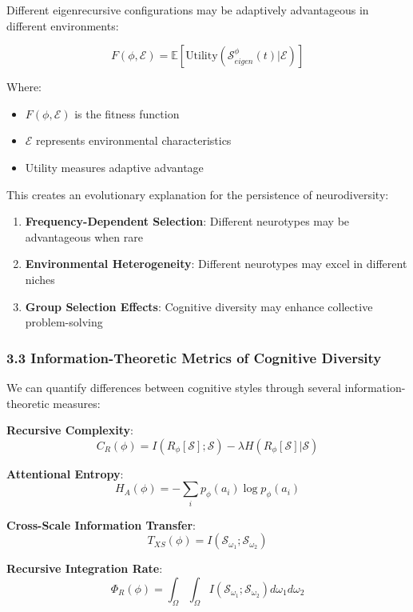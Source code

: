 \documentclass[
]{article}
\providecommand{\tightlist}{%
  \setlength{\itemsep}{0pt}\setlength{\parskip}{0pt}}
\begin{document}
Different eigenrecursive configurations may be adaptively advantageous
in different environments:

\[F(\phi, \mathcal{E}) = \mathbb{E}[\text{Utility}(\mathcal{S}_{eigen}^{\phi}(t) | \mathcal{E})]\]

Where:

\begin{itemize}
\tightlist
\item
  \(F(\phi, \mathcal{E})\) is the fitness function
\item
  \(\mathcal{E}\) represents environmental characteristics
\item
  Utility measures adaptive advantage
\end{itemize}

This creates an evolutionary explanation for the persistence of
neurodiversity:

\begin{enumerate}
\def\labelenumi{\arabic{enumi}.}
\tightlist
\item
  \textbf{Frequency-Dependent Selection}: Different neurotypes may be
  advantageous when rare
\item
  \textbf{Environmental Heterogeneity}: Different neurotypes may excel
  in different niches
\item
  \textbf{Group Selection Effects}: Cognitive diversity may enhance
  collective problem-solving
\end{enumerate}

\subsubsection{3.3 Information-Theoretic Metrics of Cognitive
Diversity}\label{information-theoretic-metrics-of-cognitive-diversity}

We can quantify differences between cognitive styles through several
information-theoretic measures:

\textbf{Recursive Complexity}:
\[C_R(\phi) = I(R_{\phi}[\mathcal{S}]; \mathcal{S}) - \lambda H(R_{\phi}[\mathcal{S}]|\mathcal{S})\]

\textbf{Attentional Entropy}:
\[H_A(\phi) = -\sum_i p_{\phi}(a_i) \log p_{\phi}(a_i)\]

\textbf{Cross-Scale Information Transfer}:
\[T_{XS}(\phi) = I(\mathcal{S}_{\omega_1}; \mathcal{S}_{\omega_2})\]

\textbf{Recursive Integration Rate}:
\[\Phi_R(\phi) = \int_{\Omega} \int_{\Omega} I(\mathcal{S}_{\omega_1}; \mathcal{S}_{\omega_2}) d\omega_1 d\omega_2\]
\end{document}
